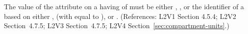 The value of the  attribute on a \Compartment having
 of  must be either ,
, or the identifier of a \UnitDefinition based on either
,  (with  equal to ), or
.  (References: L2V1 Section 4.5.4; L2V2
Section~4.7.5; L2V3 Section~4.7.5; L2V4 Section~\ref{sec:compartment-units}.)
